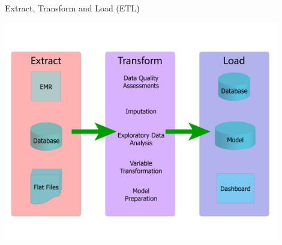 \documentclass[10pt, xcolor=table]{beamer}
\begin{document}
\begin{frame}{Extract, Transform and Load (ETL)}
	\begin{center}
		\includegraphics[width=0.9\textwidth]{images/etl.pdf}
	\end{center}	
\end{frame}
\end{document}
